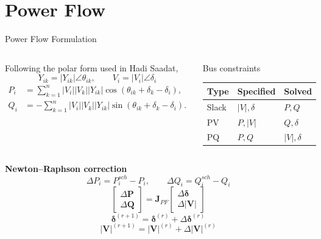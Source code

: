 ﻿\documentclass{beamer}
\begin{document}
\section{Power Flow}
\begin{frame}{Power Flow Formulation}
\begin{columns}[t,onlytextwidth]
\scriptsize
Following the polar form used in Hadi Saadat,
\[
Y_{ik}=|Y_{ik}|\angle\theta_{ik},\qquad V_i=|V_i|\angle\delta_i
\]
\begin{align*}
P_i&=\sum_{k=1}^{n}|V_i||V_k||Y_{ik}|\cos(\theta_{ik}+\delta_k-\delta_i),\\
Q_i&=-\sum_{k=1}^{n}|V_i||V_k||Y_{ik}|\sin(\theta_{ik}+\delta_k-\delta_i).
\end{align*}
\scriptsize
\begin{block}{Bus constraints}
\centering
\setlength{\tabcolsep}{3.5pt}
\begin{tabular}{lll}
\toprule
Type & Specified & Solved \\
\midrule
Slack & $|V|,\delta$ & $P,Q$ \\
PV & $P,|V|$ & $Q,\delta$ \\
PQ & $P,Q$ & $|V|,\delta$ \\
\bottomrule
\end{tabular}
\end{block}
\end{columns}
\vspace{0.10cm}
\scriptsize
\textbf{Newton--Raphson correction}
\[
\Delta P_i=P_i^{sch}-P_i,\qquad \Delta Q_i=Q_i^{sch}-Q_i
\]
\[
\boxed{\begin{bmatrix}\Delta\bm P\\\Delta\bm Q\end{bmatrix}
=\bm J_{PF}\begin{bmatrix}\Delta\bm\delta\\\Delta|\bm V|\end{bmatrix}}
\]
\[
\bm\delta^{(r+1)}=\bm\delta^{(r)}+\Delta\bm\delta^{(r)}
\]
\[
|\bm V|^{(r+1)}=|\bm V|^{(r)}+\Delta|\bm V|^{(r)}
\]
\end{frame}
\end{document}
